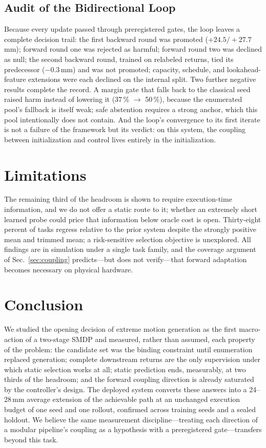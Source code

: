\documentclass{svproc}
\begin{document}
\subsection{Audit of the Bidirectional Loop}
\label{sec:audit}
Because every update passed through preregistered gates, the loop leaves a
complete decision trail: the first backward round was promoted
($+24.5/+27.7$\,mm); forward round one was rejected as harmful; forward round
two was declined as null; the second backward round, trained on relabeled
returns, tied its predecessor ($-0.3$\,mm) and was not promoted; capacity,
schedule, and lookahead-feature extensions were each declined on the internal
split. Two further negative results complete the record. A margin gate that
falls back to the classical seed raised harm instead of lowering it (37\,\%
$\rightarrow$ 50\,\%), because the enumerated pool's fallback is itself weak;
safe abstention requires a strong anchor, which this pool intentionally does
not contain. And the loop's convergence to its first iterate is not a failure
of the framework but its verdict: on this system, the coupling between
initialization and control lives entirely in the initialization.

\section{Limitations}
\label{sec:limitations}
The remaining third of the headroom is shown to require execution-time
information, and we do not offer a static route to it; whether an extremely
short learned probe could price that information below oracle cost is open.
Thirty-eight percent of tasks regress relative to the prior system despite
the strongly positive mean and trimmed mean; a risk-sensitive selection
objective is unexplored. All findings are in simulation under a single task
family, and the coverage argument of Sec.~\ref{sec:coupling} predicts---but
does not verify---that forward adaptation becomes necessary on physical
hardware.

\section{Conclusion}
\label{sec:conclusion}
We studied the opening decision of extreme motion generation as the first
macro-action of a two-stage SMDP and measured, rather than assumed, each
property of the problem: the candidate set was the binding constraint until
enumeration replaced generation; complete downstream returns are the only
supervision under which static selection works at all; static prediction
ends, measurably, at two thirds of the headroom; and the forward coupling
direction is already saturated by the controller's design. The deployed
system converts these answers into a 24--28\,mm average extension of the
achievable path at an unchanged execution budget of one seed and one rollout,
confirmed across training seeds and a sealed holdout. We believe the same
measurement discipline---treating each direction of a modular pipeline's
coupling as a hypothesis with a preregistered gate---transfers beyond this
task.



\end{document}
